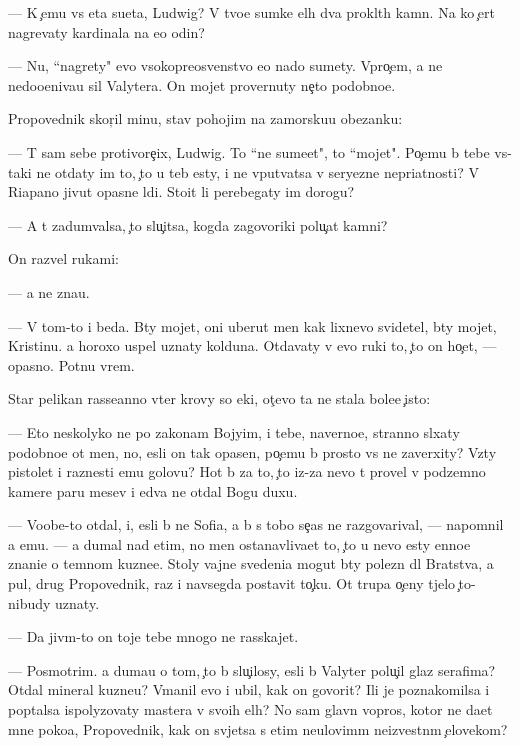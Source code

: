 \documentclass[10pt]{book}
\begin{document}
— K {\c}emu vs{\ia} eta su{\y}eta, Ludwig? V tvo{\y}e{\y} sumke {\q}el{\yi}h dva prokl{\ia}t{\yi}h kamn{\ia}. Na ko{\y} {\c}ert nagrevaty kardinala na {\y}e{\x}o odin?

— Nu, ``nagrety" {\y}evo v{\yi}sokopreosv{\ia}{\x}enstvo {\y}e{\x}o nado sumety. Vpro{\c}em, {\y}a ne nedoo{\q}eniva{\y}u sil{\yi} Valytera. On mojet provernuty ne{\c}to podobno{\y}e.

Propovednik skor{\c}il minu, stav pohojim na zamorsku{\y}u obez{\y}anku:

— T{\yi} sam sebe protivore{\c}ix, Ludwig. To ``ne sume{\y}et", to ``mojet". Po{\c}emu b{\yi} tebe vs{\e}-taki ne otdaty im to, {\c}to u teb{\ia} {\y}esty, i ne vput{\yi}vatsa v seryezn{\yi}{\y}e nepri{\y}atnosti? V Riapano jivut opasn{\yi}{\y}e l{\iu}di. Sto{\y}it li perebegaty im dorogu?

— A t{\yi} zadum{\yi}valsa, {\c}to slu{\c}itsa, kogda zagovor{\x}iki polu{\c}at kamni?

On razvel rukami:

— {\Y}a ne zna{\y}u.

— V tom-to i beda. B{\yi}ty mojet, oni uberut men{\ia} kak lixnevo svidetel{\ia}, b{\yi}ty mojet, Kristinu. {\Y}a horoxo uspel uznaty kolduna. Otdavaty v {\y}evo ruki to, {\c}to on ho{\c}et, — opasno. Pot{\ia}nu vrem{\ia}.

Star{\yi}{\y} pelikan rasse{\y}anno v{\yi}ter krovy so {\x}eki, ot{\c}evo ta ne stala bole{\y}e {\c}isto{\y}:

— Eto neskolyko ne po zakonam Bojyim, i tebe, naverno{\y}e, stranno sl{\yi}xaty podobno{\y}e ot men{\ia}, no, {\y}esli on tak opasen, po{\c}emu b{\yi} prosto vs{\e} ne zaverxity? Vz{\ia}ty pistolet i raznesti {\y}emu golovu? Hot{\ia} b{\yi} za to, {\c}to iz-za nevo t{\yi} provel v podzemno{\y} kamere paru mes{\ia}{\q}ev i {\y}edva ne otdal Bogu duxu.

— Voob{\x}e-to otdal, i, {\y}esli b{\yi} ne Sofi{\y}a, {\y}a b{\yi} s tobo{\y} se{\y}{\c}as ne razgovarival, — napomnil {\y}a {\y}emu. — {\Y}a dumal nad etim, no men{\ia} ostanavliva{\y}et to, {\c}to u nevo {\y}esty {\q}enno{\y}e znani{\y}e o temnom kuzne{\q}e. Stoly vajn{\yi}{\y}e svedeni{\y}a mogut b{\yi}ty polezn{\yi} dl{\ia} Bratstva, a pul{\ia}, drug Propovednik, raz i navsegda postavit to{\c}ku. Ot trupa o{\c}eny t{\ia}jelo {\c}to-nibudy uznaty.

— Da jiv{\yi}m-to on toje tebe mnogo ne rasskajet.

— Posmotrim. {\Y}a duma{\y}u o tom, {\c}to b{\yi} slu{\c}ilosy, {\y}esli b{\yi} Valyter polu{\c}il glaz serafima? Otdal mineral kuzne{\q}u? V{\yi}manil {\y}evo i ubil, kak on govorit? Ili je poznakomilsa i pop{\yi}talsa ispolyzovaty mastera v svo{\y}ih {\q}el{\ia}h? No sam{\yi}{\y} glavn{\yi}{\y} vopros, kotor{\yi}{\y} ne da{\y}et mne poko{\y}a, Propovednik, kak on sv{\ia}jetsa s etim neulovim{\yi}m ne{\y}izvestn{\yi}m {\c}elovekom?
\end{document}
